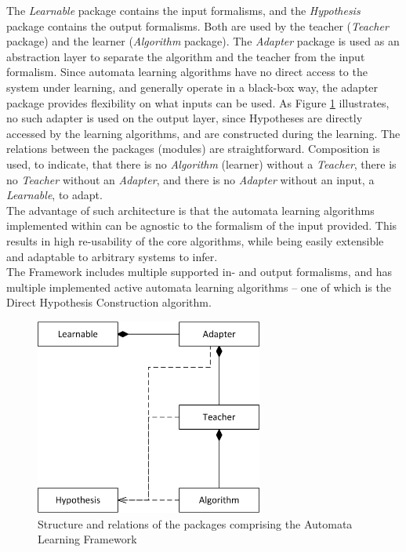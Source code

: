 \smallskip

The \textit{Learnable} package contains the input formalisms, and the \textit{Hypothesis} package contains the output formalisms. Both are used by the teacher (\textit{Teacher} package) and the learner (\textit{Algorithm} package). The \textit{Adapter} package is used as an abstraction layer to separate the algorithm and the teacher from the input formalism. Since automata learning algorithms have no direct access to the system under learning, and generally operate in a black-box way, the adapter package provides flexibility on what inputs can be used. As Figure \ref{fig_automatalearning_packages} illustrates, no such adapter is used on the output layer, since Hypotheses are directly accessed by the learning algorithms, and are constructed during the learning. The relations between the packages (modules) are straightforward.  Composition is used, to indicate, that there is no \textit{Algorithm} (learner) without a \textit{Teacher}, there is no \textit{Teacher} without an \textit{Adapter}, and there is no \textit{Adapter} without an input, a \textit{Learnable}, to adapt. \\
The advantage of such architecture is that the automata learning algorithms implemented within can be agnostic to the formalism of the input provided. This results in high re-usability of the core algorithms, while being easily extensible and adaptable to arbitrary systems to infer.  \\
The Framework includes multiple supported in- and output formalisms, and has multiple implemented active automata learning algorithms -- one of which is the Direct Hypothesis Construction algorithm.

\begin{figure}[!ht] 
	\centering
	\includegraphics[width=75mm, keepaspectratio]{figures/automatalearning_packages.png}
	\caption{Structure and relations of the packages comprising the Automata Learning Framework\cite{Barcsa-Szabo2019}} 
	\label{fig_automatalearning_packages}
\end{figure}

